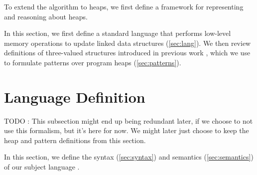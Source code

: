 
\label{ch:heap-patterns}
%

To extend the \impact algorithm to heaps, we first define a framework for representing and reasoning about heaps.


In this section, we first define a standard language that performs low-level
memory operations to update linked data structures
(\autoref{sec:lang}).
%
We then review definitions of three-valued structures introduced in
previous work \cite{sagiv02}, which we use to formulate patterns over
program heaps (\autoref{sec:patterns}).

\section{Language Definition}
\label{sec:lang}
%
TODO : This subsection might end up being redundant later, if we choose to not use this \lang formalism, but it's here for now. We might later just choose to keep the heap and pattern definitions from this section.

In this section, we define the syntax (\autoref{sec:syntax}) and
semantics (\autoref{sec:semantics}) of our subject language \lang.

